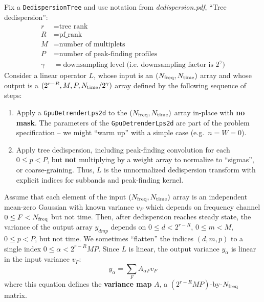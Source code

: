 \documentclass{article}
\numberwithin{equation}{section}   %
\newcommand{\ddnotes}[1]{{\em dedispersion.pdf}, ``#1''}
\begin{document}
Fix a {\tt DedispersionTree} and use notation from \ddnotes{Tree dedispersion}:
\begin{align}
r &= \mbox{tree rank} \\
R &= \mbox{pf\_rank} \\
M &= \mbox{number of multiplets} \\
P &= \mbox{number of peak-finding profiles} \\
\gamma &= \mbox{downsampling level (i.e.\ downsampling factor is $2^\gamma$)}
\end{align}
Consider a linear operator $L$, whose input is an $(N_{\rm freq}, N_{\rm time})$ array
and whose output is a $(2^{r-R}, M, P, N_{\rm time}/2^\gamma)$ array defined by the
following sequence of steps:
\begin{enumerate}
\item Apply a {\tt GpuDetrenderLps2d} to the $(N_{\rm freq}, N_{\rm time})$ array
  in-place with {\bf no mask}. The parameters of the {\tt GpuDetrenderLps2d} are
  part of the problem specification -- we might ``warm up'' with a simple
  case (e.g.\ $n=W=0$).
\item Apply tree dedispersion, including peak-finding convolution for each $0 \le p < P$, 
  but {\bf not} multiplying by a weight array to normalize to ``sigmas'', or coarse-graining.
  Thus, $L$ is the unnormalized dedispersion transform with explicit indices for subbands
  and peak-finding kernel.
\end{enumerate}
Assume that each element of the input $(N_{\rm freq}, N_{\rm time})$ array is an independent
mean-zero Gaussian with known variance $v_F$ which depends on frequency channel
$0 \le F < N_{\rm freq}$ but not time.
Then, after dedispersion reaches steady state, the variance of the output array $y_{dmp}$
depends on $0 \le d < 2^{r-R}$, $0 \le m < M$, $0 \le p < P$, but not time.
We sometimes ``flatten'' the indices $(d,m,p)$ to a single index $0 \le \alpha < 2^{r-R}MP$.
Since $L$ is linear, the output variance $y_\alpha$ is linear in the input variance $v_F$:
\begin{equation}
y_\alpha = \sum_F A_{\alpha F} v_F  \label{eq:variance_map_def}
\end{equation}
where this equation defines the {\bf variance map} $A$, a $(2^{r-R}MP)$-by-$N_{\rm freq}$ matrix.
\end{document}
